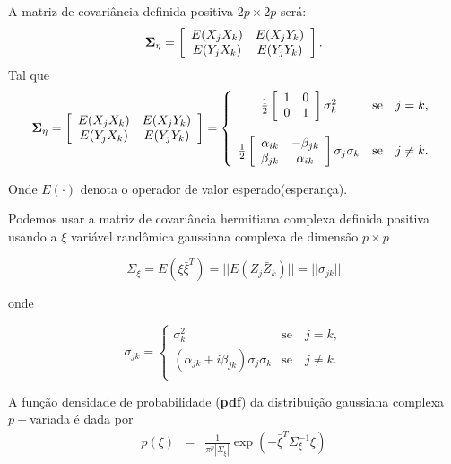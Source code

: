 \documentclass[12pt,a4paper]{article}
\begin{document}
A matriz de covariância definida positiva $2p\times 2p$ será:
$$
{\bf \Sigma_{\eta}} = \left[
\begin{array}{cc}
	E(X_jX_k)  & E(X_jY_k)  \\
	E(Y_jX_k)  & E(Y_jY_k)  \\
\end{array}
\right].
$$
Tal que
$$
{\bf \Sigma_{\eta}} = \left[
\begin{array}{cc}
	E(X_jX_k)  & E(X_jY_k)  \\
	E(Y_jX_k)  & E(Y_jY_k)  \\
\end{array}
\right]= \left\{
\begin{array}{cc}
	\frac{1}{2}\left[
\begin{array}{cc}
	 1 & 0  \\
	 0 & 1  \\
\end{array}
	\right]\sigma^{2}_{k}  & \mbox{se}\quad j=k, \\
	& \\
	\frac{1}{2}\left[
\begin{array}{cc}
	\alpha_{ik} & -\beta_{jk}  \\
	 \beta_{jk} & \alpha_{ik}  \\
\end{array}
	\right]\sigma_j\sigma_k  & \mbox{se}\quad j\neq k.   \\
\end{array}
\right.
$$

Onde $E(\cdot)$ denota o operador de valor esperado(esperança).

Podemos usar a matriz de covariância hermitiana complexa definida positiva usando a $\xi$ variável randômica gaussiana complexa de dimensão $p\times p$

$$\Sigma_{\xi}=E(\xi\bar{\xi}^{T})=||E(Z_j\bar{Z}_k)||=||\sigma_{jk}||$$

onde

$$
\sigma_{jk} = \left\{
\begin{array}{cc}
	\sigma_k^2                                & \mbox{se}\quad j=k,  \\
	(\alpha_{jk}+i\beta_{jk})\sigma_j\sigma_k & \mbox{se}\quad j\neq k. \\
\end{array}
\right.
$$

A função densidade de probabilidade ({\bf pdf}) da distribuição gaussiana complexa $p-$variada é dada por
\begin{equation}\label{sec2eqn1}
\begin{array}{ccc}
	p(\xi)&=&\frac{1}{\pi^p|\Sigma_{\xi}|}\exp(-\bar{\xi}^{T}\Sigma_{\xi}^{-1}\xi)  \\
\end{array}
\end{equation}
\end{document}
